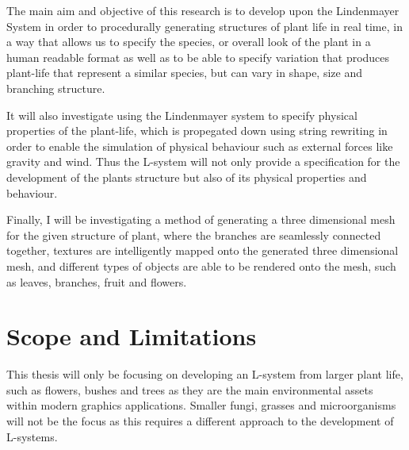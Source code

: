 \begin{flushleft}

The main aim and objective of this research is to develop upon the Lindenmayer System in order to procedurally generating structures of plant life in real time, in a way that allows us to specify the species, or overall look of the plant in a human readable format as well as to be able to specify variation that produces plant-life that represent a similar species, but can vary in shape, size and branching structure. \\

\vspace{5mm}

It will also investigate using the Lindenmayer system to specify physical properties of the plant-life, which is propegated down using string rewriting in order to enable the simulation of physical behaviour such as external forces like gravity and wind. Thus the L-system will not only provide a specification for the development of the plants structure but also of its physical properties and behaviour. \\

\vspace{5mm}

Finally, I will be investigating a method of generating a three dimensional mesh for the given structure of plant, where the branches are seamlessly connected together, textures are intelligently mapped onto the generated three dimensional mesh, and different types of objects are able to be rendered onto the mesh, such as leaves, branches, fruit and flowers.\\ 

\end{flushleft} 


\section{Scope and Limitations}

\begin{flushleft}

This thesis will only be focusing on developing an L-system from larger plant life, such as flowers, bushes and trees as they are the main environmental assets within modern graphics applications. Smaller fungi, grasses and microorganisms will not be the focus as this requires a different approach to the development of L-systems.\\

\end{flushleft}

